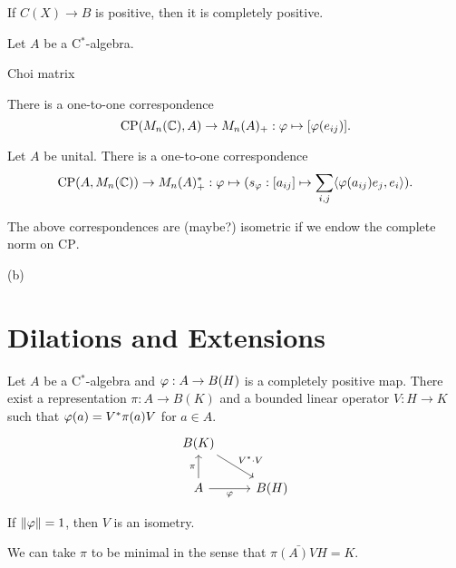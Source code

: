 \documentclass{../../large}
\begin{document}
\begin{prb}
If $C(X)\to B$ is positive, then it is completely positive.
\end{prb}


\begin{prb}
Let $A$ be a C$^*$-algebra.
\begin{parts}
\item Choi matrix
\item
There is a one-to-one correspondence
\[\mathrm{CP}(M_n(\mathbb{C}),A)\to M_n(A)_+:\varphi\mapsto[\varphi(e_{ij})].\]
\item
Let $A$ be unital.
There is a one-to-one correspondence
\[\mathrm{CP}(A,M_n(\mathbb{C}))\to M_n(A)^*_+:\varphi\mapsto(s_\varphi:[a_{ij}]\mapsto\sum_{i,j}\langle\varphi(a_{ij})e_j,e_i\rangle).\]
\item The above correspondences are (maybe?) isometric if we endow the complete norm on $\mathrm{CP}$.
\end{parts}
\end{prb}
\begin{pf}
(b)


\end{pf}

\section{Dilations and Extensions}

\begin{prb}
Let $A$ be a C$^*$-algebra and $\varphi:A\to B(H)$ is a completely positive map.
There exist a representation $\pi:A\to B(K)$ and a bounded linear operator $V:H\to K$ such that $\varphi(a)=V^*\pi(a)V$ for $a\in A$.
\[\begin{tikzcd}
B(K) \ar{dr}{V^*\cdot V} &\\
A \ar[swap]{r}{\f} \ar{u}{\pi} & B(H)
\end{tikzcd}\]
\begin{parts}
\item If $\|\varphi\|=1$, then $V$ is an isometry.
\item 
\item We can take $\pi$ to be minimal in the sense that $\bar{\pi(A)VH}=K$.
\end{parts}
\end{prb}
\begin{pf}

\end{pf}
\end{document}
